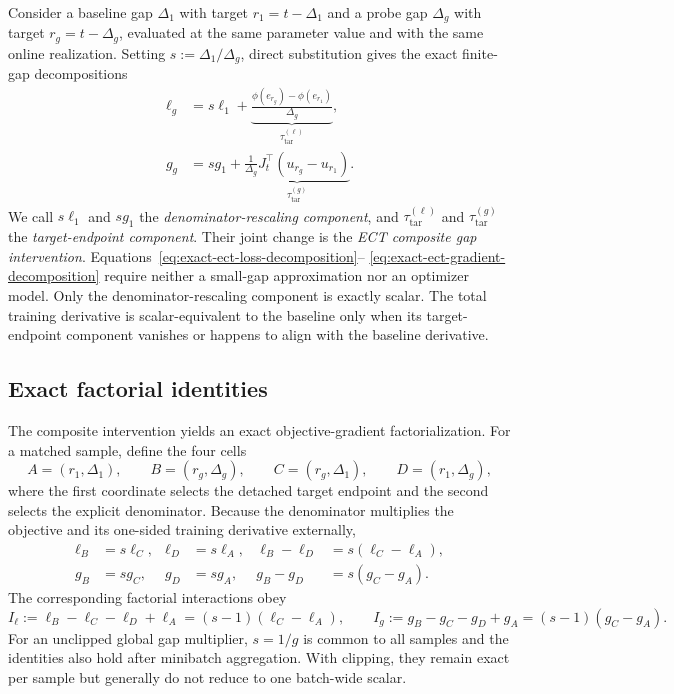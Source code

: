 \documentclass{article}
\begin{document}
Consider a baseline gap $\Delta_1$ with target
$r_1=t-\Delta_1$ and a probe gap $\Delta_g$ with target
$r_g=t-\Delta_g$, evaluated at the same parameter value and with the same
online realization. Setting $s:=\Delta_1/\Delta_g$, direct substitution gives
the exact finite-gap decompositions
\begin{align}
  \ell_g
  &=s\ell_1
    +\underbrace{\frac{\phi(e_{r_g})-\phi(e_{r_1})}{\Delta_g}}
      _{\tau^{(\ell)}_{\mathrm{tar}}},
  \label{eq:exact-ect-loss-decomposition}\\
  g_g
  &=s g_1
    +\underbrace{\frac{1}{\Delta_g}J_t^\top
      \left(u_{r_g}-u_{r_1}\right)}
      _{\tau^{(g)}_{\mathrm{tar}}}.
  \label{eq:exact-ect-gradient-decomposition}
\end{align}
We call $s\ell_1$ and $s g_1$ the \emph{denominator-rescaling component}, and
$\tau^{(\ell)}_{\mathrm{tar}}$ and $\tau^{(g)}_{\mathrm{tar}}$ the
\emph{target-endpoint component}. Their joint change is the
\emph{ECT composite gap intervention}.
Equations~\eqref{eq:exact-ect-loss-decomposition}--
\eqref{eq:exact-ect-gradient-decomposition} require neither a small-gap
approximation nor an optimizer model. Only the denominator-rescaling component
is exactly scalar. The total training derivative is scalar-equivalent to the
baseline only when its target-endpoint component vanishes or happens to align
with the baseline derivative.

\subsection{Exact factorial identities}
\label{sec:theory-factorial-identities}

The composite intervention yields an exact objective-gradient factorialization.
For a matched sample, define the four cells
\begin{equation}
  A=(r_1,\Delta_1),\qquad
  B=(r_g,\Delta_g),\qquad
  C=(r_g,\Delta_1),\qquad
  D=(r_1,\Delta_g),
  \label{eq:factorial-cells}
\end{equation}
where the first coordinate selects the detached target endpoint and the second
selects the explicit denominator. Because the denominator multiplies the
objective and its one-sided training derivative externally,
\begin{align}
  \ell_B&=s\ell_C,&
  \ell_D&=s\ell_A,&
  \ell_B-\ell_D&=s(\ell_C-\ell_A),
  \label{eq:factorial-loss-identities}\\
  g_B&=s g_C,&
  g_D&=s g_A,&
  g_B-g_D&=s(g_C-g_A).
  \label{eq:factorial-gradient-identities}
\end{align}
The corresponding factorial interactions obey
\begin{equation}
  I_\ell:=\ell_B-\ell_C-\ell_D+\ell_A
  =(s-1)(\ell_C-\ell_A),
  \qquad
  I_g:=g_B-g_C-g_D+g_A
  =(s-1)(g_C-g_A).
  \label{eq:exact-factorial-interactions}
\end{equation}
For an unclipped global gap multiplier, $s=1/g$ is common to all samples and
the identities also hold after minibatch aggregation. With clipping, they
remain exact per sample but generally do not reduce to one batch-wide scalar.
\end{document}

